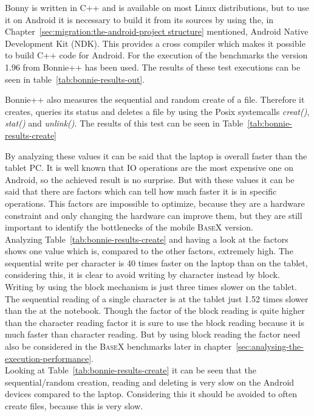Bonny is written in C++ and is available on most Linux distributions, but to use it on Android it is necessary to build it from its sources by using the, in Chapter~\ref{sec:migration:the-android-project structure} mentioned, Android Native Development Kit (NDK).
This provides a cross compiler which makes it possible to build C++ code for Android.
For the execution of the benchmarks the version 1.96 from Bonnie++ has been used.
The results of these test executions can be seen in table~\ref{tab:bonnie-results-out}.

Bonnie++ also measures the sequential and random create of a file.
Therefore it creates, queries its status and deletes a file by using the Posix systemcalls \textit{creat()}, \textit{stat()} and \textit{unlink()}.
The results of this test can be seen in Table~\ref{tab:bonnie-results-create}

By analyzing these values it can be said that the laptop is overall faster than the tablet PC.
It is well known that IO operations are the most expensive one on Android, so the achieved result is no surprise. 
But with these values it can be said that there are factors which can tell how much faster it is in specific operations.
This factors are impossible to optimize, because they are a hardware constraint and only changing the hardware can improve them, but they are still important to identify the bottlenecks of the mobile \textsc{BaseX} version.\\
Analyzing Table~\ref{tab:bonnie-results-create} and having a look at the factors shows one value which is, compared to the other factors, extremely high.
The sequential write per character is 40 times faster on the laptop than on the tablet, considering this, it is clear to avoid writing by character instead by block.
Writing by using the block mechanism is just three times slower on the tablet.
The sequential reading of a single character is at the tablet just 1.52 times slower than the at the notebook.
Though the factor of the block reading is quite higher than the character reading factor it is sure to use the block reading because it is much faster than character reading.
But by using block reading the factor need also be considered in the \textsc{BaseX} benchmarks later in chapter~\ref{sec:analysing-the-execution-performance}.
\\
Looking at Table~\ref{tab:bonnie-results-create} it can be seen that the sequential/random creation, reading and deleting is very slow on the Android devices compared to the laptop.
Considering this it should be avoided to often create files, because this is very slow.\\
